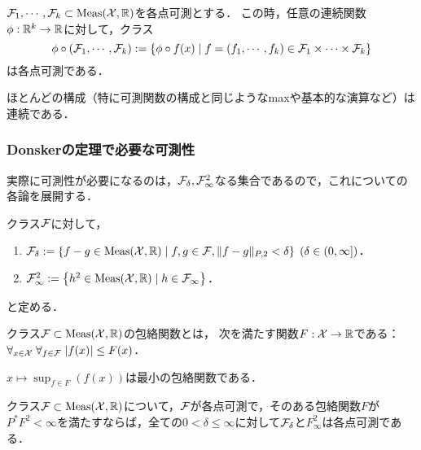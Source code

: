 \documentclass[uplatex,dvipdfmx]{jsreport}
\begin{document}
\begin{lemma}[各点可測性の保存]
    $\mathcal{F}_1,\cdots,\mathcal{F}_k\subset\mathrm{Meas}(\mathcal{X},\mathbb{R})$を各点可測とする．
    この時，任意の連続関数$\phi:\mathbb{R}^k\to\mathbb{R}$に対して，クラス
    \[\phi\circ(\mathcal{F}_1,\cdots,\mathcal{F}_k):=\left\{\phi\circ f(x)\mid f=(f_1,\cdots,f_k)\in\mathcal{F}_1\times\cdots\times\mathcal{F}_k\right\}\]
    は各点可測である．
\end{lemma}
\begin{remarks}
    ほとんどの構成（特に可測関数の構成と同じようなmaxや基本的な演算など）は連続である．
\end{remarks}

\subsubsection{Donskerの定理で必要な可測性}

\begin{tcolorbox}[colframe=ForestGreen, colback=ForestGreen!10!white,breakable,colbacktitle=ForestGreen!40!white,coltitle=black,fonttitle=\bfseries\sffamily,
title=]
    実際に可測性が必要になるのは，$\mathcal{F}_\delta,\mathcal{F}_\infty^2$なる集合であるので，これについての各論を展開する．
\end{tcolorbox}

\begin{notation}
    クラス$\mathcal{F}$に対して，
    \begin{enumerate}
        \item $\mathcal{F}_\delta:=\left\{f-g\in\mathrm{Meas}(\mathcal{X},\mathbb{R})\mid f,g\in\mathcal{F},\|f-g\|_{P,2}<\delta\right\}\;(\delta\in(0,\infty])$．
        \item $\mathcal{F}^2_\infty:=\left\{h^2\in\mathrm{Meas}(\mathcal{X},\mathbb{R})\mid h\in\mathcal{F}_\infty\right\}$．
    \end{enumerate}
    と定める．
\end{notation}

\begin{definition}\label{def-envelope-function}
    クラス$\mathcal{F}\subset\mathrm{Meas}(\mathcal{X},\mathbb{R})$の包絡関数とは，
    次を満たす関数$F:\mathcal{X}\to\mathbb{R}$である：$\forall_{x\in\mathcal{X}}\;\forall_{f\in\mathcal{F}}\;\lvert f(x)\rvert\le F(x)$．
\end{definition}
\begin{example}
    $x\mapsto\sup_{f\in F}(f(x))$は最小の包絡関数である．
\end{example}

\begin{proposition}\label{prop-pointwise-measurability-of-F2-Finf}
    クラス$\mathcal{F}\subset\mathrm{Meas}(\mathcal{X},\mathbb{R})$について，$\mathcal{F}$が各点可測で，そのある包絡関数$F$が$P^*F^2<\infty$を満たすならば，全ての$0<\delta\le\infty$に対して$\mathcal{F}_\delta$と$F^2_\infty$は各点可測である．
\end{proposition}
\end{document}
